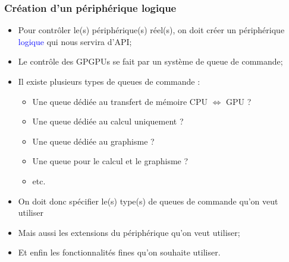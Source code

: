 \documentclass{beamer}
\begin{document}
\begin{frame}[fragile]
\frametitle{Création d'un périphérique logique}

\begin{itemize}
\item Pour contrôler le(s) périphérique(s) réel(s), on doit créer un périphérique
\textcolor{blue}{logique} qui nous servira d'API;
\item Le contrôle des GPGPUs se fait par un système de queue de commande;
\item Il existe plusieurs types de queues de commande :
\begin{itemize}
    \item Une queue dédiée au transfert de mémoire CPU $\Longleftrightarrow$ GPU ?
    \item Une queue dédiée au calcul uniquement ?
    \item Une queue dédiée au graphisme ?
    \item Une queue pour le calcul et le graphisme ?
    \item etc.
    \end{itemize}
\item On doit donc spécifier le(s) type(s) de queues de commande qu'on veut utiliser
\item Mais aussi les extensions du périphérique qu'on veut utiliser;
\item Et enfin les fonctionnalités fines qu'on souhaite utiliser.
\end{itemize}
\end{frame}
\end{document}
